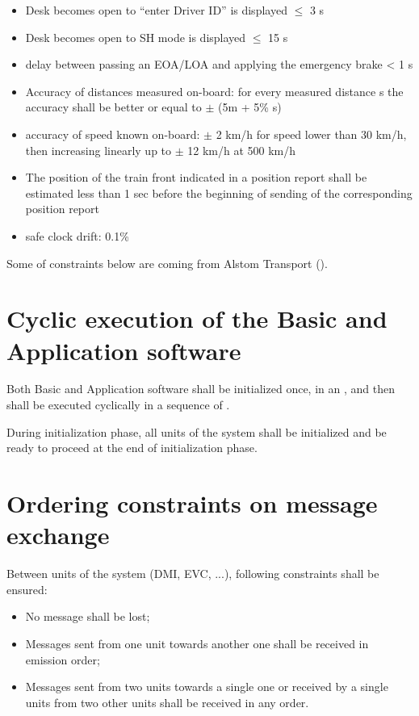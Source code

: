 \begin{itemize}
\item Desk becomes open to ``enter Driver ID'' is displayed $\le$ 3 s

\item Desk becomes open to SH mode is displayed $\le$ 15 s

\item delay between passing an EOA/LOA and applying the emergency
  brake < 1 s

\item Accuracy of distances measured on-board: for every measured
  distance s the accuracy shall be better or equal to $\pm$ (5m + 5\% s)

\item accuracy of speed known on-board: $\pm$ 2 km/h for speed lower
  than 30 km/h, then increasing linearly up to $\pm$ 12 km/h at 500 km/h

\item The position of the train front indicated in a position report
  shall be estimated less than 1 sec before the beginning of sending
  of the corresponding position report

\item safe clock drift: 0.1\%

\end{itemize}

Some of constraints below are coming from Alstom Transport
(\cite{alstom-api}).

\section{Cyclic execution of the Basic and Application software}

Both Basic and Application software shall be initialized once, in an
, and then shall be executed cyclically
in a sequence of .

During initialization phase, all units of the system shall be
initialized and be ready to proceed at the end of initialization
phase.

\section{Ordering constraints on message exchange}
\label{sec:ordering-constraints}

Between units of the system (DMI, EVC, ...), following constraints
shall be ensured:
\begin{itemize}
\item No message shall be lost;
\item Messages sent from one unit towards another one shall be
  received in emission order;
\item Messages sent from two units towards a
single one or received by a single units from two other units shall be
received in any order.
\end{itemize}

